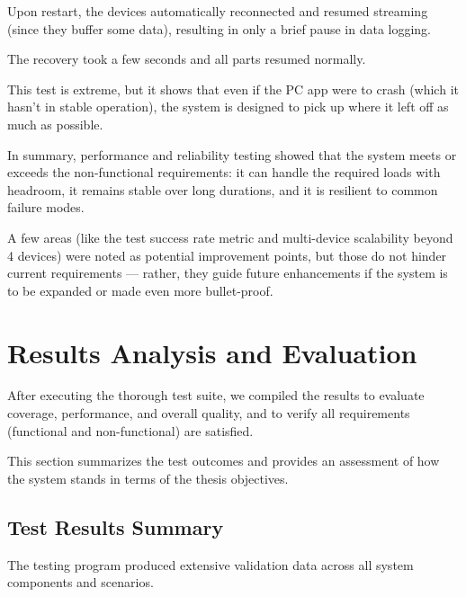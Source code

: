 {{{{{{{{{{{{Upon restart, the devices automatically reconnected and resumed streaming (since they buffer some data), resulting in only a brief pause in data logging.

The recovery took a few seconds and all parts resumed normally.

This test is extreme, but it shows that even if the PC app were to crash (which it hasn't in stable operation), the system is designed to pick up where it left off as much as possible.

In summary, performance and reliability testing showed that the system meets or exceeds the non-functional requirements: it can handle the required loads with headroom, it remains stable over long durations, and it is resilient to common failure modes.

A few areas (like the test success rate metric and multi-device scalability beyond 4 devices) were noted as potential improvement points, but those do not hinder current requirements --- rather, they guide future enhancements if the system is to be expanded or made even more bullet-proof.

\section{Results Analysis and Evaluation}

After executing the thorough test suite, we compiled the results to evaluate coverage, performance, and overall quality, and to verify all requirements (functional and non-functional) are satisfied.

This section summarizes the test outcomes and provides an assessment of how the system stands in terms of the thesis objectives.

\subsection{Test Results Summary}

The testing program produced extensive validation data across all system components and scenarios.

}}}}}}}}}}}}

